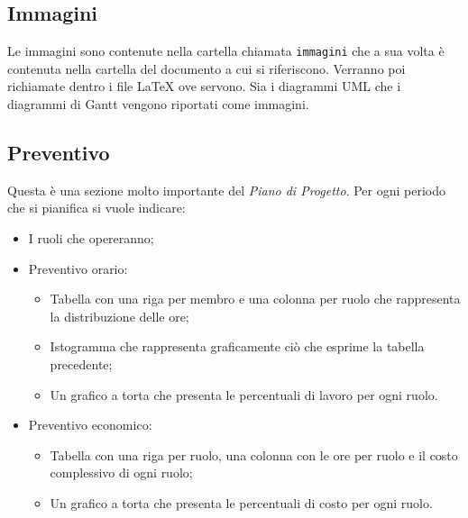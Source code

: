 \subsection{Immagini}
Le immagini sono contenute nella cartella chiamata \texttt{immagini} che a sua volta è contenuta nella cartella del documento a cui si riferiscono. Verranno poi richiamate dentro i file \LaTeX{} ove servono. Sia i diagrammi UML che i diagrammi di Gantt vengono riportati come immagini.
\subsection{Preventivo}
Questa è una sezione molto importante del \textit{Piano di Progetto}.
Per ogni periodo che si pianifica si vuole indicare:
\begin{itemize}
    \item I ruoli che opereranno;
    \item Preventivo orario:
        \begin{itemize}
            \item Tabella con una riga per membro e una colonna per ruolo che rappresenta la distribuzione delle ore;
            \item Istogramma che rappresenta graficamente ciò che esprime la tabella precedente;
            \item Un grafico a torta che presenta le percentuali di lavoro per ogni ruolo.
        \end{itemize}
    \item Preventivo economico:
        \begin{itemize}
            \item Tabella con una riga per ruolo, una colonna con le ore per ruolo e il costo complessivo di ogni ruolo;
            \item Un grafico a torta che presenta le percentuali di costo per ogni ruolo.
        \end{itemize}
\end{itemize}

